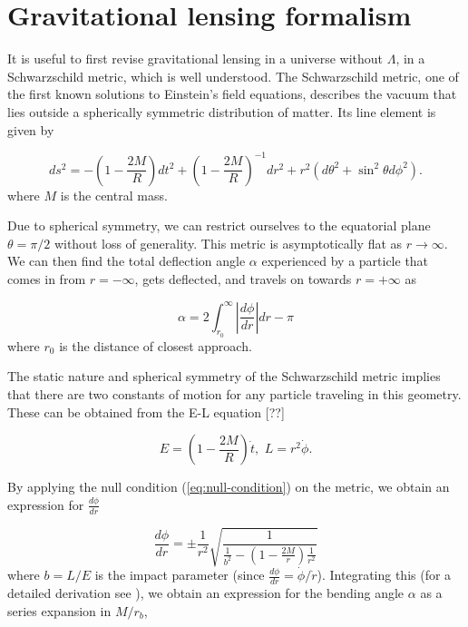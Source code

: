 \chapter{Gravitational lensing formalism}

It is useful to first revise gravitational lensing in a universe without $\Lambda$, in a Schwarzschild metric, which is well understood. The Schwarzschild metric, one of the first known solutions to Einstein's field equations, describes the vacuum that lies outside a spherically symmetric distribution of matter. Its line element is given by

\begin{equation}
  ds^2 = -\left ( 1- \frac{2M}{R} \right ) dt^2 + \left ( 1 - \frac{2M}{R}\right )^{-1} dr^2 + r^2(d\theta^2 + \sin^2\theta d \phi^2).
  \label{eq:schwarzschild-metric}
\end{equation}
where $M$ is the central mass. 

Due to spherical symmetry, we can restrict ourselves to the equatorial plane $\theta = \pi/2$ without loss of generality. This metric is asymptotically flat as $r \rightarrow \infty$. We can then find the total deflection angle $\alpha$ experienced by a particle that comes in from $r=-\infty$, gets deflected, and travels on towards $r=+\infty$ as 

\begin{equation}
  \alpha = 2 \int_{r_0}^{\infty} \left |  \frac{d\phi}{dr} \right | dr - \pi
\end{equation}
where $r_0$ is the distance of closest approach. 

The static nature and spherical symmetry of the Schwarzschild metric implies that there are two constants of motion for any particle traveling in this geometry. These can be obtained from the E-L equation [??]

\begin{equation}
  E = \left ( 1 - \frac{2M}{R} \right ) \dot{t}, \,\, L = r^2\dot{\phi}.
  \label{eq:schwarzschild-constants}
\end{equation}

By applying the null condition (\autoref{eq:null-condition}) on the metric, we obtain an expression for $\frac{d\phi}{dr}$

\begin{equation}
  \frac{d\phi}{dr} = \pm \frac{1}{r^2} \sqrt{\frac{1}{ \frac{1}{b^2} - \left (1- \frac{2M}{r} \right )\frac{1}{r^2} }}
  \label{eq:dphi-dr}
\end{equation}
where $b = L/E$ is the impact parameter (since $\frac{d\phi}{dr} = \dot{\phi}/\dot{r}$). Integrating this (for a detailed derivation see \cite{keeton2005formalism}), we obtain an expression for the bending angle $\alpha$ as a series expansion in $M/r_b$, 

